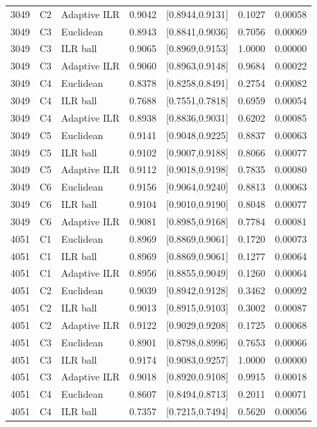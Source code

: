 \documentclass{article}
\begin{document}
{\begin{longtable}{rrlrrrr}
3049 & C2 & Adaptive ILR & 0.9042 & [0.8944,0.9131] & 0.1027 & 0.00058 \\
3049 & C3 & Euclidean & 0.8943 & [0.8841,0.9036] & 0.7056 & 0.00069 \\
3049 & C3 & ILR ball & 0.9065 & [0.8969,0.9153] & 1.0000 & 0.00000 \\
3049 & C3 & Adaptive ILR & 0.9060 & [0.8963,0.9148] & 0.9684 & 0.00022 \\
3049 & C4 & Euclidean & 0.8378 & [0.8258,0.8491] & 0.2754 & 0.00082 \\
3049 & C4 & ILR ball & 0.7688 & [0.7551,0.7818] & 0.6959 & 0.00054 \\
3049 & C4 & Adaptive ILR & 0.8938 & [0.8836,0.9031] & 0.6202 & 0.00085 \\
3049 & C5 & Euclidean & 0.9141 & [0.9048,0.9225] & 0.8837 & 0.00063 \\
3049 & C5 & ILR ball & 0.9102 & [0.9007,0.9188] & 0.8066 & 0.00077 \\
3049 & C5 & Adaptive ILR & 0.9112 & [0.9018,0.9198] & 0.7835 & 0.00080 \\
3049 & C6 & Euclidean & 0.9156 & [0.9064,0.9240] & 0.8813 & 0.00063 \\
3049 & C6 & ILR ball & 0.9104 & [0.9010,0.9190] & 0.8048 & 0.00077 \\
3049 & C6 & Adaptive ILR & 0.9081 & [0.8985,0.9168] & 0.7784 & 0.00081 \\
4051 & C1 & Euclidean & 0.8969 & [0.8869,0.9061] & 0.1720 & 0.00073 \\
4051 & C1 & ILR ball & 0.8969 & [0.8869,0.9061] & 0.1277 & 0.00064 \\
4051 & C1 & Adaptive ILR & 0.8956 & [0.8855,0.9049] & 0.1260 & 0.00064 \\
4051 & C2 & Euclidean & 0.9039 & [0.8942,0.9128] & 0.3462 & 0.00092 \\
4051 & C2 & ILR ball & 0.9013 & [0.8915,0.9103] & 0.3002 & 0.00087 \\
4051 & C2 & Adaptive ILR & 0.9122 & [0.9029,0.9208] & 0.1725 & 0.00068 \\
4051 & C3 & Euclidean & 0.8901 & [0.8798,0.8996] & 0.7653 & 0.00066 \\
4051 & C3 & ILR ball & 0.9174 & [0.9083,0.9257] & 1.0000 & 0.00000 \\
4051 & C3 & Adaptive ILR & 0.9018 & [0.8920,0.9108] & 0.9915 & 0.00018 \\
4051 & C4 & Euclidean & 0.8607 & [0.8494,0.8713] & 0.2011 & 0.00071 \\
4051 & C4 & ILR ball & 0.7357 & [0.7215,0.7494] & 0.5620 & 0.00056 \\

\end{longtable}}
\end{document}
